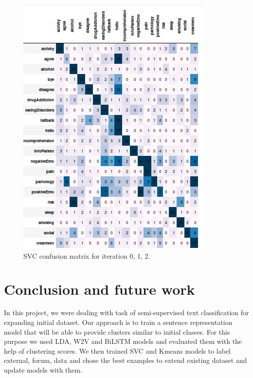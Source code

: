 \documentclass[11pt]{article}
\begin{document}
\begin{figure}[h]
	\includegraphics[scale=0.25]{svc2_cm.png}
	\caption{SVC confusion matrix for iteration 0, 1, 2.}
\label{rbf_svc_cm}
\end{figure}
\FloatBarrier


\section{Conclusion and future work}
\label{sec:conclusion}

In this project, we were dealing with task of semi-supervised text
classification for expanding initial dataset. Our approach is to train
a sentence representation model that will be able to provide clusters
similar to initial classes. For this purpose we used LDA, W2V and
BiLSTM models and evaluated them with the help of clustering
scores. We then trained SVC and Kmeans models to label external,
forum, data and chose the best examples to extend existing
dataset and update models with them.

\end{document}
